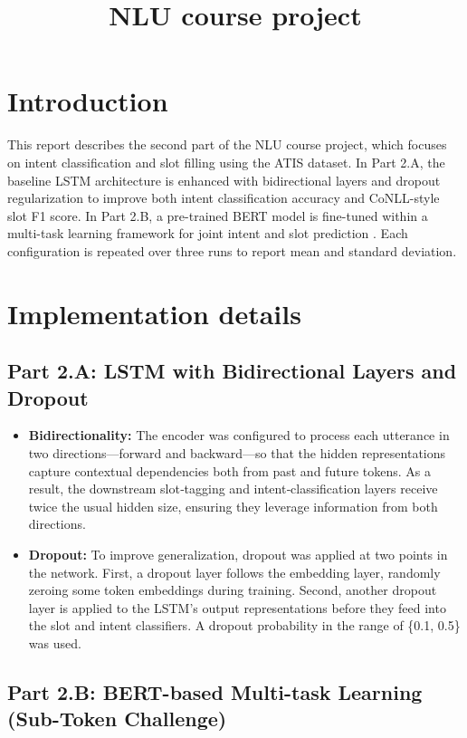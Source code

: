 \documentclass[a4paper]{article}
\title{NLU course project}
\begin{document}
\maketitle

\section{Introduction}
This report describes the second part of the NLU course project, which focuses on intent classification and slot filling using the ATIS dataset. In Part 2.A, the baseline LSTM architecture is enhanced with bidirectional layers and dropout regularization to improve both intent classification accuracy and CoNLL-style slot F1 score. In Part 2.B, a pre-trained BERT model is fine-tuned within a multi-task learning framework for joint intent and slot prediction \cite{devlin2019bert, chen2019bert}. Each configuration is repeated over three runs to report mean and standard deviation.
\section{Implementation details}

\subsection{Part 2.A: LSTM with Bidirectional Layers and Dropout}

\begin{itemize}
  \item \textbf{Bidirectionality:} 
    The encoder was configured to process each utterance in two directions—forward and backward—so that the hidden representations capture contextual dependencies both from past and future tokens. As a result, the downstream slot‐tagging and intent‐classification layers receive twice the usual hidden size, ensuring they leverage information from both directions.

  \item \textbf{Dropout:}
    To improve generalization, dropout was applied at two points in the network. First, a dropout layer follows the embedding layer, randomly zeroing some token embeddings during training. Second, another dropout layer is applied to the LSTM’s output representations before they feed into the slot and intent classifiers. A dropout probability in the range of \{0.1, 0.5\} was used.
\end{itemize}

\subsection{Part 2.B: BERT-based Multi-task Learning (Sub-Token Challenge)}
\end{document}
